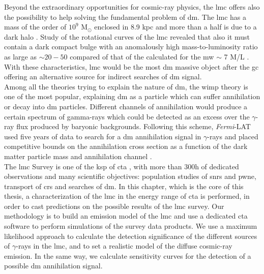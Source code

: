 \documentclass[main.tex]{subfiles}
\begin{document}
Beyond the extraordinary opportunities for cosmic-ray physics, the \gls{lmc} offers also the possibility to help solving the fundamental problem of \gls{dm}. The \gls{lmc} has a mass of the order of $10^9$ M$_{\odot}$ enclosed in 8.9 kpc and more than a half is due to a dark halo \cite{2002LMCkinematics}. Study of the rotational curves of the \gls{lmc} revealed that also it must contain a dark compact bulge with an anomalously high mass-to-luminosity ratio as large as $\sim 20-50$ \cite{1999LMCbulge} compared of that of the calculated for the \gls{mw} $\sim$ 7 M/L \cite{2013MWbulge}. With these characteristics, \gls{lmc} would be the most \gls{dm} massive object after the \gls{gc} offering an alternative source for indirect searches of \gls{dm} signal.\\
Among all the theories trying to explain the nature of \gls{dm}, the \gls{wimp} theory is one of the most popular, explaining \gls{dm} as a particle which can suffer annihilation or decay into \gls{dm} particles. Different channels of annihilation would produce a certain spectrum of gamma-rays \cite{2011cirelli} which could be detected as an excess over the $\gamma$-ray flux produced by baryonic backgrounds. Following this scheme, \textit{Fermi}-LAT used five years of data to search for a \gls{dm} annihilation signal in $\gamma$-rays and placed competitive bounds on the annihilation cross section as a function of the dark matter particle mass and annihilation channel \cite{2010FermiLATLMC11months}.\\
The \gls{lmc} Survey is one of the \gls{ksp} of \gls{cta} \cite{2019SciencewithCTA}, with more than 300h of dedicated observations and many scientific objectives: population studies of \glspl{snr} and \gls{pwne}, transport of \glspl{cr} and searches of \gls{dm}.
In this chapter, which is the core of this thesis, a characterization of the \gls{lmc} in the energy range of \gls{cta} is performed, in order to cast predictions on the possible results of the \gls{lmc} survey. Our methodology is to build an emission model of the \gls{lmc} and use a dedicated \gls{cta} software to perform simulations of the survey data products. We use a maximum likelihood approach to calculate the detection significance of the different sources of $\gamma$-rays in the \gls{lmc}, and to set a realistic model of the diffuse cosmic-ray emission. In the same way, we calculate sensitivity curves for the detection of a possible \gls{dm} annihilation signal.\\
\end{document}
